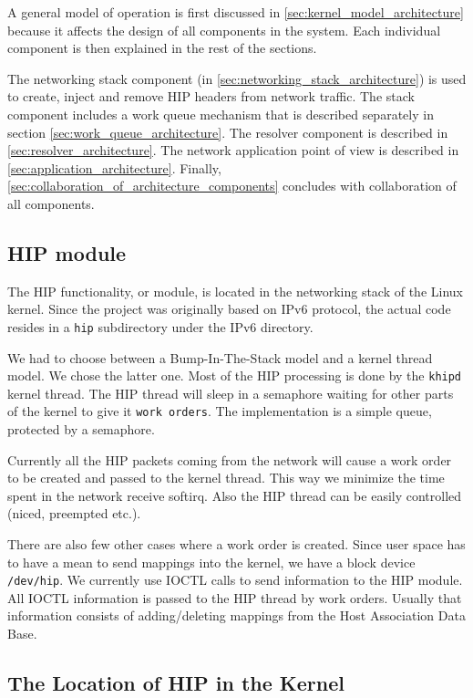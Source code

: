 A general model of operation is first discussed in
\autoref{sec:kernel_model_architecture} because it affects the design
of all components in the system. Each individual component is then
explained in the rest of the sections.

The networking stack component (in
\autoref{sec:networking_stack_architecture}) is used to create, inject
and remove HIP headers from network traffic. The stack component
includes a work queue mechanism that is described separately in
section \autoref{sec:work_queue_architecture}. The resolver component
is described in \autoref{sec:resolver_architecture}. The network
application point of view is described in
\autoref{sec:application_architecture}. Finally,
\autoref{sec:collaboration_of_architecture_components} concludes with
collaboration of all components.

\subsection{HIP module}
\label{sec:kernel_model_architecture}

The HIP functionality, or module, is located in the networking stack of the
Linux kernel. Since the project was originally based on IPv6 protocol, the
actual code resides in a \verb|hip| subdirectory under the IPv6 directory.

We had to choose between a Bump-In-The-Stack model and a kernel thread
model. We chose the latter one. Most of the HIP processing is done by
the \verb|khipd| kernel thread. The HIP thread will sleep in a semaphore
waiting for other parts of the kernel to give it \verb|work orders|. The
implementation is a simple queue, protected by a semaphore.

Currently all the HIP packets coming from the network will cause a
work order to be created and passed to the kernel thread. This way we
minimize the time spent in the network receive softirq. Also the HIP
thread can be easily controlled (niced, preempted etc.).

There are also few other cases where a work order is created. Since
user space has to have a mean to send mappings into the kernel, we
have a block device \verb|/dev/hip|.  We currently use IOCTL calls to
send information to the HIP module. All IOCTL information is passed to
the HIP thread by work orders. Usually that information consists of
adding/deleting mappings from the Host Association Data Base.

\subsection{The Location of HIP in the Kernel}

